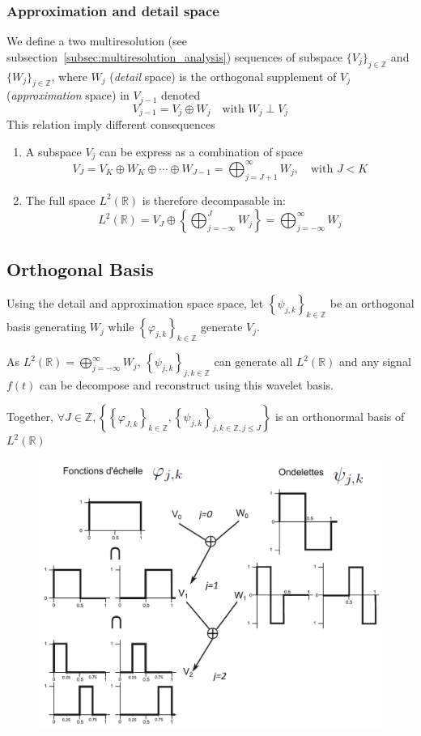 \documentclass[twocolumn]{article}
\numberwithin{equation}{section}
\begin{document}
			\subsubsection{Approximation and detail space}
We define a two multiresolution (see subsection~\ref{subsec:multiresolution_analysis}) sequences of subspace $\{V_j\}_{j\in \mathbb Z}$ and $\{W_j\}_{j\in \mathbb Z}$, where $W_j$ (\textit{detail} space) is the orthogonal supplement of $V_j$(\textit{approximation} space) in $V_{j-1}$ denoted 
$$V_{j-1}=V_j \oplus W_j \quad \text{with } W_j \perp V_j$$
This relation imply different consequences
\begin{enumerate}[label=(\roman*)]
	\item A subspace $V_j$ can be express as a combination of space
	$$V_J=V_K \oplus W_K \oplus \cdots \oplus W_{J-1}=\bigoplus_{j=J+1}^\infty W_j, \quad \text{with } J < K$$
	\item The full space $L^2(\mathbb R )$ is therefore decompasable in:
	$$L^2(\mathbb R )=V_J \oplus \left \{ \bigoplus_{j=-\infty}^J W_j\right \}=\bigoplus_{j=-\infty}^\infty W_j$$ 
\end{enumerate}



		\subsection{Orthogonal Basis}

Using the detail and approximation space space, let $\left\{ \psi_{j,k} \right\}_{k\in \mathbb{Z}}$ be an orthogonal basis generating $W_j$ while $\left\{ \varphi_{j,k} \right\}_{k\in \mathbb{Z}}$ generate $V_j$.  

As $L^2(\mathbb R )=\bigoplus_{j=-\infty}^\infty W_j$,  $\left\{ \psi_{j,k} \right\}_{j,k\in \mathbb{Z}}$ can generate all $L^2(\mathbb R)$ and any signal $f(t)$ can be decompose and reconstruct using this wavelet basis. 

Together, $\forall J \in \mathbb{Z}, \left\{ \left\{ \varphi_{J,k} \right\}_{k\in \mathbb{Z}}, \left\{ \psi_{j,k} \right\}_{j,k\in \mathbb{Z},j\le J} \right\}$ is an orthonormal basis of $L^2(\mathbb R )$
\begin{figure}[H]
\centering
    \includegraphics[width=.49\textwidth]{WVjk.png}
\end{figure}
\end{document}
